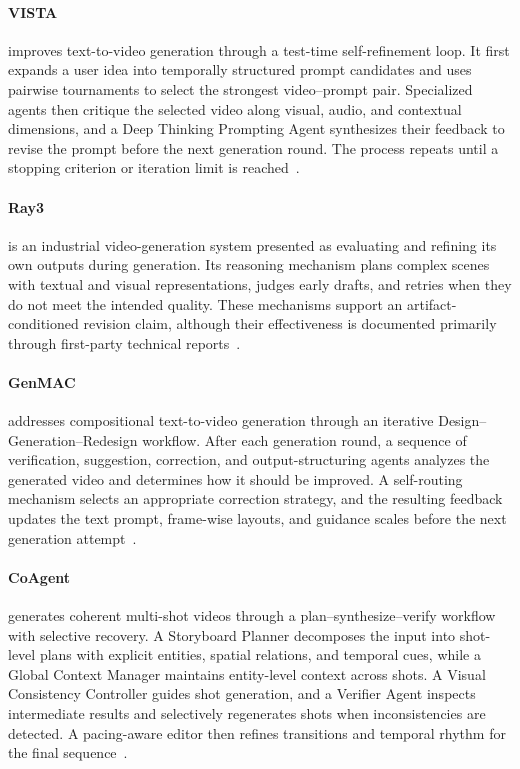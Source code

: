 \paragraph{VISTA}
 improves text-to-video generation through a test-time self-refinement loop. It first expands a user idea into temporally structured prompt candidates and uses pairwise tournaments to select the strongest video--prompt pair. Specialized agents then critique the selected video along visual, audio, and contextual dimensions, and a Deep Thinking Prompting Agent synthesizes their feedback to revise the prompt before the next generation round. The process repeats until a stopping criterion or iteration limit is reached~\cite{long2026vista}.

\paragraph{Ray3}
 is an industrial video-generation system presented as evaluating and refining its own outputs during generation. Its reasoning mechanism plans complex scenes with textual and visual representations, judges early drafts, and retries when they do not meet the intended quality. These mechanisms support an artifact-conditioned revision claim, although their effectiveness is documented primarily through first-party technical reports~\cite{luma2025ray3}.

\paragraph{GenMAC}
 addresses compositional text-to-video generation through an iterative Design--Generation--Redesign workflow. After each generation round, a sequence of verification, suggestion, correction, and output-structuring agents analyzes the generated video and determines how it should be improved. A self-routing mechanism selects an appropriate correction strategy, and the resulting feedback updates the text prompt, frame-wise layouts, and guidance scales before the next generation attempt~\cite{huang2024genmac}.

\paragraph{CoAgent}
 generates coherent multi-shot videos through a plan--synthesize--verify workflow with selective recovery. A Storyboard Planner decomposes the input into shot-level plans with explicit entities, spatial relations, and temporal cues, while a Global Context Manager maintains entity-level context across shots. A Visual Consistency Controller guides shot generation, and a Verifier Agent inspects intermediate results and selectively regenerates shots when inconsistencies are detected. A pacing-aware editor then refines transitions and temporal rhythm for the final sequence~\cite{avg251222536}.

